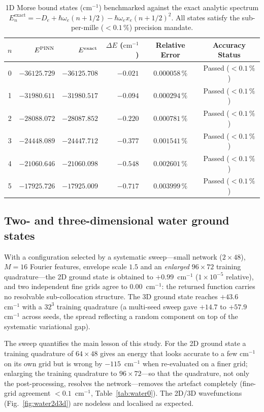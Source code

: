 \documentclass[11pt,a4paper]{article}
\newcommand{\cmi}{\ensuremath{\mathrm{cm}^{-1}}}
\begin{document}
\begin{table}[t]
\centering
\caption{1D Morse bound states ($\text{cm}^{-1}$) benchmarked against the exact analytic spectrum $E_n^{\mathrm{exact}} = -D_e + \hbar\omega_e(n+1/2) - \hbar\omega_e x_e(n+1/2)^2$. All states satisfy the sub-per-mille ($< 0.1\,\%$) precision mandate.}
\label{tab:1d}
\begin{tabular}{crrrcc}
\toprule
$n$ & $E^{\rm PINN}$ & $E^{\rm exact}$ & $\Delta E$ ($\text{cm}^{-1}$) & Relative Error & Accuracy Status \\
\midrule
0 & $-36125.729$ & $-36125.708$ & $-0.021$ & $0.000058\,\%$ & Passed ($< 0.1\,\%$) \\
1 & $-31980.611$ & $-31980.517$ & $-0.094$ & $0.000294\,\%$ & Passed ($< 0.1\,\%$) \\
2 & $-28088.072$ & $-28087.852$ & $-0.220$ & $0.000781\,\%$ & Passed ($< 0.1\,\%$) \\
3 & $-24448.089$ & $-24447.712$ & $-0.377$ & $0.001541\,\%$ & Passed ($< 0.1\,\%$) \\
4 & $-21060.646$ & $-21060.098$ & $-0.548$ & $0.002601\,\%$ & Passed ($< 0.1\,\%$) \\
5 & $-17925.726$ & $-17925.009$ & $-0.717$ & $0.003999\,\%$ & Passed ($< 0.1\,\%$) \\
\bottomrule
\end{tabular}
\end{table}

\subsection{Two- and three-dimensional water ground states}

With a configuration selected by a systematic sweep---small network
($2\times48$), $M=16$ Fourier features, envelope scale $1.5$ and an
\emph{enlarged} $96\times72$ training quadrature---the 2D ground state is
obtained to $\mathbf{+0.99}$~\cmi{} ($1\times10^{-5}$ relative), and two
independent fine grids agree to $0.00$~\cmi{}: the returned function carries
no resolvable sub-collocation structure. The 3D ground state reaches $+43.6$~
\cmi{} with a $32^3$ training quadrature (a multi-seed sweep gave $+14.7$ to
$+57.9$~\cmi{} across seeds, the spread reflecting a random component on top
of the systematic variational gap).

The sweep quantifies the main lesson of this study. For the 2D ground state a
training quadrature of $64\times48$ gives an energy that looks accurate to a
few \cmi{} on its own grid but is wrong by $-115$~\cmi{} when re-evaluated on
a finer grid; enlarging the training quadrature to $96\times72$---so that the
quadrature, not only the post-processing, resolves the network---removes the
artefact completely (fine-grid agreement $<0.1$~\cmi{},
Table~\ref{tab:water0}). The 2D/3D wavefunctions
(Fig.~\ref{fig:water2d3d}) are nodeless and localised as expected.
\end{document}
